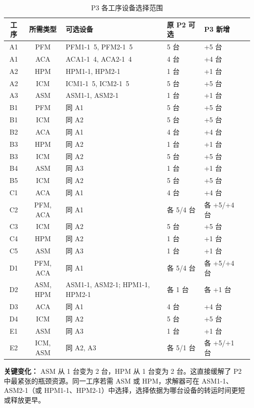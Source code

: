 \documentclass[UTF8,a4paper,12pt]{ctexart}
\begin{document}
\begin{table}[htbp]
  \centering
  \caption{P3 各工序设备选择范围}
  \label{tab:p3_device_range}
  \begin{tabular}{ccllll}
    \toprule
    工序 & 所需类型 & 可选设备 & 原 P2 可选 & P3 新增 \\
    \midrule
    A1 & PFM & PFM1-1~5, PFM2-1~5 & 5 台 & +5 台 \\
    A1 & ACA & ACA1-1~4, ACA2-1~4 & 4 台 & +4 台 \\
    A2 & HPM & HPM1-1, HPM2-1 & 1 台 & +1 台 \\
    A2 & ICM & ICM1-1~5, ICM2-1~5 & 5 台 & +5 台 \\
    A3 & ASM & ASM1-1, ASM2-1 & 1 台 & +1 台 \\
    B1 & PFM & 同 A1 & 5 台 & +5 台 \\
    B1 & ICM & 同 A2 & 5 台 & +5 台 \\
    B2 & ACA & 同 A1 & 4 台 & +4 台 \\
    B3 & HPM & 同 A2 & 1 台 & +1 台 \\
    B3 & ICM & 同 A2 & 5 台 & +5 台 \\
    B4 & ASM & 同 A3 & 1 台 & +1 台 \\
    B5 & ICM & 同 A2 & 5 台 & +5 台 \\
    C1 & ACA & 同 A1 & 4 台 & +4 台 \\
    C2 & PFM, ACA & 同 A1 & 各 5/4 台 & 各 +5/+4 台 \\
    C3 & ICM & 同 A2 & 5 台 & +5 台 \\
    C4 & HPM & 同 A2 & 1 台 & +1 台 \\
    C5 & ASM & 同 A3 & 1 台 & +1 台 \\
    D1 & PFM, ACA & 同 A1 & 各 5/4 台 & 各 +5/+4 台 \\
    D2 & ASM, HPM & ASM1-1, ASM2-1; HPM1-1, HPM2-1 & 各 1 台 & 各 +1 台 \\
    D3 & ACA & 同 A1 & 4 台 & +4 台 \\
    D4 & ICM & 同 A2 & 5 台 & +5 台 \\
    E1 & ASM & 同 A3 & 1 台 & +1 台 \\
    E2 & ICM, ASM & 同 A2, A3 & 各 5/1 台 & 各 +5/+1 台 \\
    \bottomrule
  \end{tabular}
\end{table}

\textbf{关键变化：} ASM 从 1 台变为 2 台，HPM 从 1 台变为 2 台。这直接缓解了 P2 中最紧张的瓶颈资源。同一工序若需 ASM 或 HPM，求解器可在 ASM1-1、ASM2-1（或 HPM1-1、HPM2-1）中选择，选择依据为哪台设备的转运时间更短或释放更早。
\end{document}
